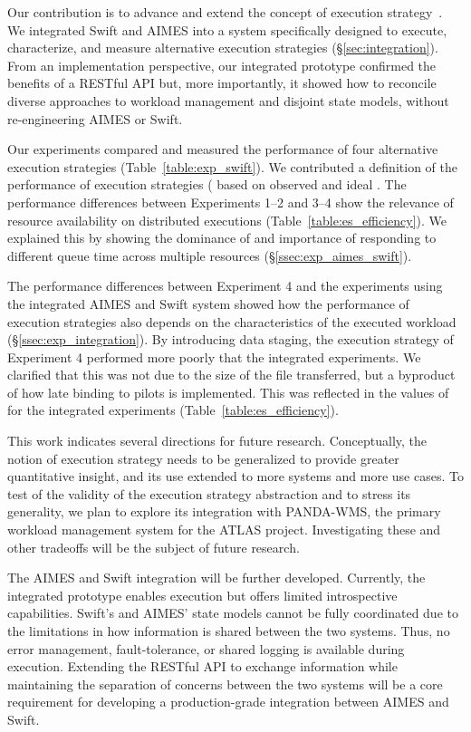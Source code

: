 \documentclass[10pt, conference, compsocconf]{IEEEtran}
\begin{document}
Our contribution is to advance and extend the concept of execution
strategy~\cite{turilli2016integrating}.  We integrated Swift and AIMES into a
system specifically designed to execute, characterize, and measure
alternative execution strategies (\S\ref{sec:integration}). From an
implementation perspective, our integrated prototype confirmed the benefits
of a RESTful API but, more importantly, it showed how to reconcile diverse
approaches to workload management and disjoint state models, without
re-engineering AIMES or Swift.

Our experiments compared and measured the performance of four alternative
execution strategies (Table~\ref{table:exp_swift}). We contributed a
definition of the performance of execution strategies ( based on
observed and ideal . The performance differences between Experiments
1--2 and 3--4 show the relevance of resource availability on distributed
executions (Table~\ref{table:es_efficiency}).  We explained this by showing
the dominance of  and importance of responding to different queue time
across multiple resources (\S\ref{ssec:exp_aimes_swift}).

The performance differences between Experiment 4 and the experiments using
the integrated AIMES and Swift system showed how the performance of execution
strategies also depends on the characteristics of the executed workload
(\S\ref{ssec:exp_integration}). By introducing data staging, the execution
strategy of Experiment 4 performed more poorly that the integrated
experiments. We clarified that this was not due to the size of the file
transferred, but a byproduct of how late binding to pilots is implemented.
This was reflected in the values of  for the integrated experiments
(Table~\ref{table:es_efficiency}).

This work indicates several directions for future research. Conceptually, the
notion of execution strategy needs to be generalized to provide greater
quantitative insight, and its use extended to more systems and more use
cases.  To test of the validity of the execution strategy abstraction and to
stress its generality, we plan to explore its integration with PANDA-WMS, the
primary workload management system for the ATLAS project. Investigating these
and other tradeoffs will be the subject of future research.

The AIMES and Swift integration will be further developed.  Currently, the
integrated prototype enables execution but offers limited introspective
capabilities. Swift's and AIMES' state models cannot be fully coordinated due
to the limitations in how information is shared between the two systems.
Thus, no error management, fault-tolerance, or shared logging is available
during execution. Extending the RESTful API to exchange information while
maintaining the separation of concerns between the two systems will be a core
requirement for developing a production-grade integration between AIMES and
Swift.
\end{document}
